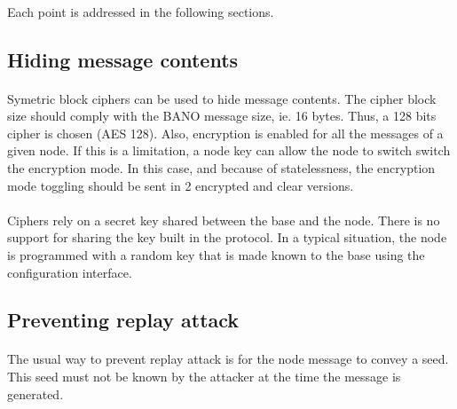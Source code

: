 \documentclass[a4paper, 11pt]{article}
\begin{document}
\paragraph{}
Each point is addressed in the following sections.

\subsection{Hiding message contents}
\paragraph{}
Symetric block ciphers can be used to hide message contents. The cipher
block size should comply with the BANO message size, ie. 16 bytes. Thus,
a 128 bits cipher is chosen (AES 128). Also, encryption is enabled for
all the messages of a given node. If this is a limitation, a node key
can allow the node to switch switch the encryption mode. In this case,
and because of statelessness, the encryption mode toggling should be
sent in 2 encrypted and clear versions.
\paragraph{}
Ciphers rely on a secret key shared between the base and the node. There
is no support for sharing the key built in the protocol. In a typical
situation, the node is programmed with a random key that is made known
to the base using the configuration interface.

\subsection{Preventing replay attack}
\paragraph{}
The usual way to prevent replay attack is for the node message to convey
a seed. This seed must not be known by the attacker at the time the message
is generated.
\end{document}
